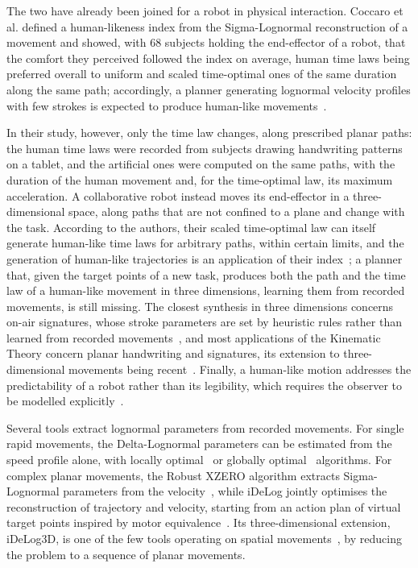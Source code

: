 \documentclass[12pt]{report}
\begin{document}
The two have already been joined for a robot in physical interaction. Coccaro et al. defined a human-likeness index from the Sigma-Lognormal reconstruction of a movement and showed, with 68 subjects holding the end-effector of a robot, that the comfort they perceived followed the index on average, human time laws being preferred overall to uniform and scaled time-optimal ones of the same duration along the same path; accordingly, a planner generating lognormal velocity profiles with few strokes is expected to produce human-like movements~\cite{coccaro}. 

In their study, however, only the time law changes, along prescribed planar paths: the human time laws were recorded from subjects drawing handwriting patterns on a tablet, and the artificial ones were computed on the same paths, with the duration of the human movement and, for the time-optimal law, its maximum acceleration. A collaborative robot instead moves its end-effector in a three-dimensional space, along paths that are not confined to a plane and change with the task. According to the authors, their scaled time-optimal law can itself generate human-like time laws for arbitrary paths, within certain limits, and the generation of human-like trajectories is an application of their index~\cite{coccaro}; a planner that, given the target points of a new task, produces both the path and the time law of a human-like movement in three dimensions, learning them from recorded movements, is still missing. The closest synthesis in three dimensions concerns on-air signatures, whose stroke parameters are set by heuristic rules rather than learned from recorded movements~\cite{ferrer2023onair}, and most applications of the Kinematic Theory concern planar handwriting and signatures, its extension to three-dimensional movements being recent~\cite{schindler2018,idelog3d}. Finally, a human-like motion addresses the predictability of a robot rather than its legibility, which requires the observer to be modelled explicitly~\cite{dragan2013}.

Several tools extract lognormal parameters from recorded movements. For single rapid movements, the Delta-Lognormal parameters can be estimated from the speed profile alone, with locally optimal~\cite{djioua2009} or globally optimal~\cite{oreilly2012} algorithms. For complex planar movements, the Robust XZERO algorithm extracts Sigma-Lognormal parameters from the velocity~\cite{oreilly2009}, while iDeLog jointly optimises the reconstruction of trajectory and velocity, starting from an action plan of virtual target points inspired by motor equivalence~\cite{idelog}. Its three-dimensional extension, iDeLog3D, is one of the few tools operating on spatial movements~\cite{idelog3d}, by reducing the problem to a sequence of planar movements.
\end{document}
